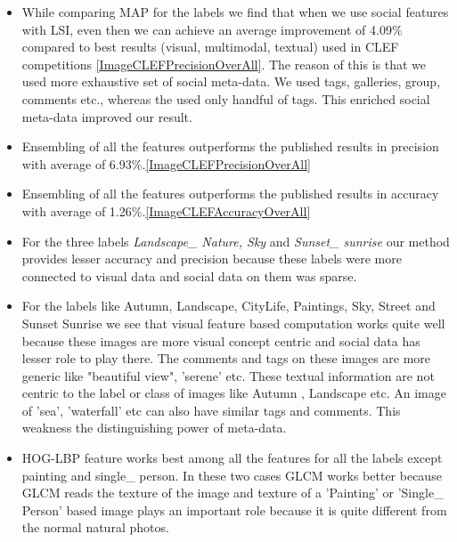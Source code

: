 \begin{itemize}

\item While comparing MAP for the labels we find that when we use 
social features with LSI, even then we can  achieve an average 
improvement of 4.09\% compared to best results (visual, multimodal, textual) used in CLEF competitions \ref{ImageCLEFPrecisionOverAll}. The reason of this is that we used more exhaustive set of social meta-data. We used tags, galleries, group, comments etc., whereas the \citet*{CLEF} used only handful of tags. This enriched social meta-data improved our result.

\item Ensembling of all the features outperforms the published results in precision with average of 6.93\%.\ref{ImageCLEFPrecisionOverAll}


\item Ensembling of all the features outperforms the published 
results in accuracy with average of 1.26\%.\ref{ImageCLEFAccuracyOverAll}

\item For the three labels \textit{Landscape\_ Nature, Sky} and \textit{Sunset\_ sunrise} our method provides lesser accuracy and 
precision because these labels were more connected to visual data and social data on them was sparse.

\item For the labels like Autumn, Landscape,  CityLife, Paintings, Sky, Street and Sunset Sunrise we see that visual 
feature based computation works quite well because these images 
are more visual concept centric and social data has lesser role to 
play there. The comments and tags on these images are more generic like "beautiful view", 'serene' etc. These textual information are not centric to the label or class of images like Autumn , Landscape etc. An image of 'sea', 'waterfall' etc can also have similar tags and comments. This weakness the distinguishing power of meta-data.

\item HOG-LBP feature works best among all the features for all the labels except painting and single\_ person. In these two cases GLCM 
works better because GLCM reads the texture of the image and texture of a 'Painting' or 'Single\_ Person' based image plays an important role because it is quite different from the normal natural photos.

\end{itemize}

